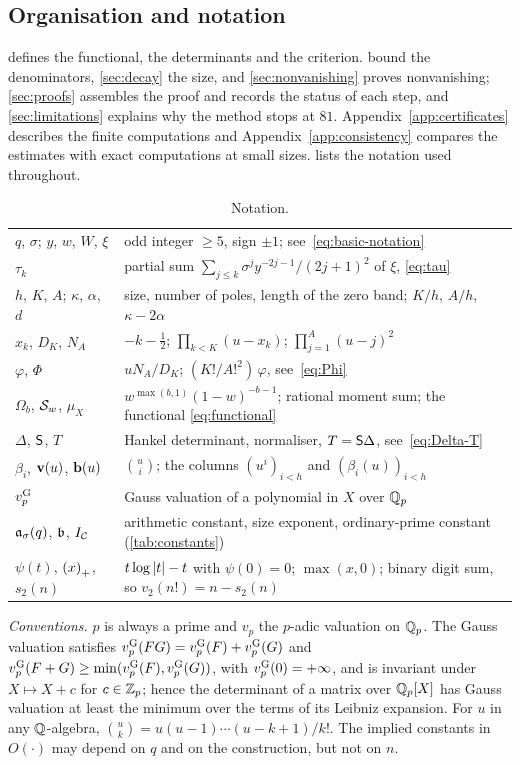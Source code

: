 \subsection{Organisation and notation}\label{subsec:notation}

 defines the functional, the determinants and the criterion.
 bound the denominators, \cref{sec:decay} the
size, and \cref{sec:nonvanishing} proves nonvanishing; \cref{sec:proofs} assembles the proof and
records the status of each step, and \cref{sec:limitations} explains why the method stops at $81$.
Appendix~\ref{app:certificates} describes the finite computations and
Appendix~\ref{app:consistency} compares the estimates with exact computations at small sizes.
 lists the notation used throughout.

\begin{table}[ht]
\centering
\caption{Notation.}\label{tab:notation}
\small
\begin{tabular}{@{}p{}p{}@{}}
\toprule
$q$, $\sigma$; $y$, $w$, $W$, $\xi$ & odd integer $\ge5$, sign $\pm1$; see~\eqref{eq:basic-notation}\\
$\tau_k$ & partial sum $\sum_{j\le k}\sigma^jy^{-2j-1}/(2j+1)^2$ of $\xi$, \eqref{eq:tau}\\
$h$, $K$, $A$; $\kappa$, $\alpha$, $d$ & size, number of poles, length of the zero band;
$K/h$, $A/h$, $\kappa-2\alpha$\\
$x_k$, $D_K$, $N_A$ & $-k-\frac12$; $\prod_{k<K}(u-x_k)$; $\prod_{j=1}^A(u-j)^2$\\
$\varphi$, $\Phi$ & $uN_A/D_K$; $(K!/A!^2)\,\varphi$, see~\eqref{eq:Phi}\\
$\Omega_b$, $\mathcal{S}_w$, $\mu_X$ & $w^{\max(b,1)}(1-w)^{-b-1}$; rational moment sum; the functional
\eqref{eq:functional}\\
$\Delta$, $\mathsf{S}$, $T$ & Hankel determinant, normaliser, $T=\mathsf{S}\Delta$, see~\eqref{eq:Delta-T}\\
$\beta_i$, $\mathbf{v}(u)$, $\mathbf{b}(u)$ & $\binom ui$; the columns $(u^i)_{i<h}$ and $(\beta_i(u))_{i<h}$\\
$v_{p}^{\mathrm{G}}$ & Gauss valuation of a polynomial in $X$ over $\mathbb{Q}_p$\\
$\mathfrak{a}_\sigma(q)$, $\mathfrak{b}$, $I_{\mathcal C}$ & arithmetic constant, size exponent,
ordinary-prime constant (\cref{tab:constants})\\
$\psi(t)$, $\left(x\right)_{+}$, $s_2(n)$ & $t\log\left\lvert t\right\rvert-t$ with $\psi(0)=0$; $\max(x,0)$; binary digit
sum, so $v_2(n!)=n-s_2(n)$\\
\bottomrule
\end{tabular}
\end{table}

\emph{Conventions.} $p$ is always a prime and $v_p$ the $p$-adic valuation on $\mathbb{Q}_p$. The Gauss
valuation satisfies $v_{p}^{\mathrm{G}}(FG)=v_{p}^{\mathrm{G}}(F)+v_{p}^{\mathrm{G}}(G)$ and $v_{p}^{\mathrm{G}}(F+G)\ge\min(v_{p}^{\mathrm{G}}(F),v_{p}^{\mathrm{G}}(G))$, with
$v_{p}^{\mathrm{G}}(0)=+\infty$, and is invariant under $X\mapsto X+c$ for $c\in\mathbb{Z}_p$; hence the determinant of
a matrix over $\mathbb{Q}_p[X]$ has Gauss valuation at least the minimum over the terms of its Leibniz
expansion. For $u$ in any $\mathbb{Q}$-algebra, $\binom uk=u(u-1)\cdots(u-k+1)/k!$. The implied constants
in $O(\cdot)$ may depend on $q$ and on the construction, but not on $n$.
